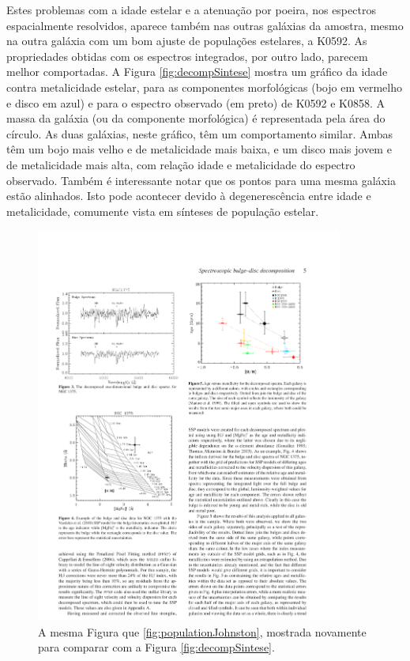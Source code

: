 Estes problemas com a idade estelar e a atenuação por poeira, nos espectros
espacialmente resolvidos, aparece também nas outras galáxias da amostra, mesmo
na outra galáxia com um bom ajuste de populações estelares, a K0592. As
propriedades obtidas com os espectros integrados, por outro lado, parecem melhor
comportadas. A Figura \ref{fig:decompSintese} mostra um gráfico da idade contra
metalicidade estelar, para as componentes morfológicas (bojo em vermelho e disco
em azul) e para o espectro observado (em preto) de K0592 e K0858. A massa da
galáxia (ou da componente morfológica) é representada pela área do círculo.
As duas galáxias, neste gráfico, têm um comportamento similar.
Ambas têm um bojo mais velho e de metalicidade mais baixa, e um disco mais jovem
e de metalicidade mais alta, com relação idade e metalicidade do espectro
observado. Também é interessante notar que os pontos para uma mesma galáxia
estão alinhados. Isto pode acontecer devido à degenerescência entre idade e
metalicidade, comumente vista em sínteses de população estelar.

\begin{figure}
	\includegraphics[width=0.9\textwidth]{figuras/johnston-pop}
	\caption[A mesma Figura que \ref{fig:populationJohnston}] {A mesma Figura que
	\ref{fig:populationJohnston}, mostrada novamente para comparar com a Figura
	\ref{fig:decompSintese}.}
	\label{fig:populationJohnston2}
\end{figure}


